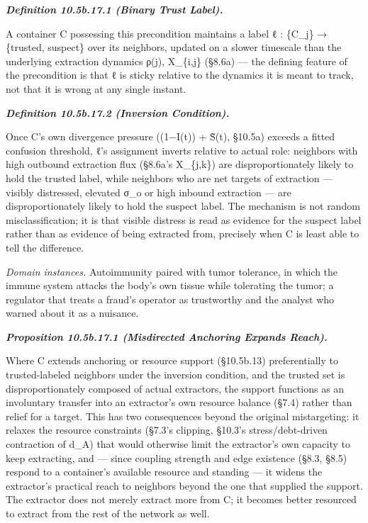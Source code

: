 \documentclass[
]{article}
\begin{document}
\emph{\textbf{Definition 10.5b.17.1 (Binary Trust Label).}}

A container C possessing this precondition maintains a label ℓ :
\{C\_j\} → \{trusted, suspect\} over its neighbors, updated on a slower
timescale than the underlying extraction dynamics ρ(j), X\_\{i,j\}
(§8.6a) --- the defining feature of the precondition is that ℓ is sticky
relative to the dynamics it is meant to track, not that it is wrong at
any single instant.

\emph{\textbf{Definition 10.5b.17.2 (Inversion Condition).}}

Once C's own divergence pressure ((1−I(t)) + S̃(t), §10.5a) exceeds a
fitted confusion threshold, ℓ's assignment inverts relative to actual
role: neighbors with high outbound extraction flux (§8.6a's X\_\{j,k\})
are disproportionately likely to hold the trusted label, while neighbors
who are net targets of extraction --- visibly distressed, elevated σ\_o
or high inbound extraction --- are disproportionately likely to hold the
suspect label. The mechanism is not random misclassification; it is that
visible distress is read as evidence for the suspect label rather than
as evidence of being extracted from, precisely when C is least able to
tell the difference.

\emph{Domain instances.} Autoimmunity paired with tumor tolerance, in
which the immune system attacks the body's own tissue while tolerating
the tumor; a regulator that treats a fraud's operator as trustworthy and
the analyst who warned about it as a nuisance.

\emph{\textbf{Proposition 10.5b.17.1 (Misdirected Anchoring Expands
Reach).}}

Where C extends anchoring or resource support (§10.5b.13) preferentially
to trusted-labeled neighbors under the inversion condition, and the
trusted set is disproportionately composed of actual extractors, the
support functions as an involuntary transfer into an extractor's own
resource balance (§7.4) rather than relief for a target. This has two
consequences beyond the original mistargeting: it relaxes the resource
constraints (§7.3's clipping, §10.3's stress/debt-driven contraction of
d\_A) that would otherwise limit the extractor's own capacity to keep
extracting, and --- since coupling strength and edge existence (§8.3,
§8.5) respond to a container's available resource and standing --- it
widens the extractor's practical reach to neighbors beyond the one that
supplied the support. The extractor does not merely extract more from C;
it becomes better resourced to extract from the rest of the network as
well.
\end{document}
